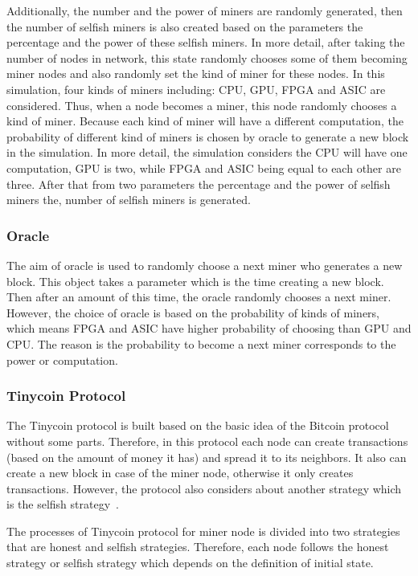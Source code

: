 \documentclass[runningheads,a4paper]{llncs}
\begin{document}
Additionally, the number and the power of miners are randomly generated, then the number of selfish miners is also created based on the parameters the percentage and the power of these selfish miners.
In more detail, after taking the number of nodes in network, this state randomly chooses some of them becoming miner nodes and also randomly set the kind of miner for these nodes.
In this simulation, four kinds of miners including: CPU, GPU, FPGA and ASIC are considered.
Thus, when a node becomes a miner, this node randomly chooses a kind of miner.
Because each kind of miner will have a different computation, the probability of different kind of miners is chosen by oracle to generate a new block in the simulation.
In more detail, the simulation considers the CPU will have one computation, GPU is two, while FPGA and ASIC being equal to each other are three.
After that from two parameters the percentage and the power of selfish miners the, number of selfish miners is generated.

\subsubsection{Oracle}
The aim of oracle is used to randomly choose a next miner who generates a new block. 
This object takes a parameter which is the time creating a new block.
Then after an amount of this time, the oracle randomly chooses a next miner.
However, the choice of oracle is based on the probability of kinds of miners, which means FPGA and ASIC have higher probability of choosing than GPU and CPU.
The reason is the probability  to become a next miner corresponds to the power or computation.

\subsubsection{Tinycoin Protocol}
The Tinycoin protocol is built based on the basic idea of the Bitcoin protocol without some parts. 
Therefore, in this protocol each node can create transactions (based on the amount of money it has) and spread it to its neighbors.
It also can create a new block in case of the miner node, otherwise it only creates transactions.
However, the protocol also considers about another strategy which is the selfish strategy~\cite{eyal2014majority}.

The processes of Tinycoin protocol for miner node is divided into two strategies that are honest and selfish strategies.
Therefore, each node follows the honest strategy or selfish strategy which depends on the definition of initial state.
\end{document}
